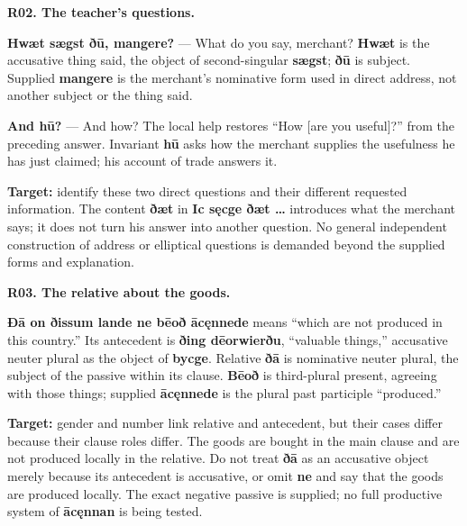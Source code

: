 \par\begin{minipage}{\linewidth}\raggedright
\textbf{R02. The teacher's questions.}

\textbf{Hwæt sægst ðū, mangere?} — What do you say, merchant? \textbf{Hwæt} is the accusative thing said, the object of second-singular \textbf{sægst}; \textbf{ðū} is subject. Supplied \textbf{mangere} is the merchant's nominative form used in direct address, not another subject or the thing said.

\textbf{And hū?} — And how? The local help restores “How [are you useful]?” from the preceding answer. Invariant \textbf{hū} asks how the merchant supplies the usefulness he has just claimed; his account of trade answers it.

\textbf{Target:} identify these two direct questions and their different requested information. The content \textbf{ðæt} in \textbf{Ic sęcge ðæt …} introduces what the merchant says; it does not turn his answer into another question. No general independent construction of address or elliptical questions is demanded beyond the supplied forms and explanation.

\end{minipage}\par\addvspace{4pt}

\par\begin{minipage}{\linewidth}\raggedright
\textbf{R03. The relative about the goods.}

\textbf{Ðā on ðissum lande ne bēoð ācęnnede} means “which are not produced in this country.” Its antecedent is \textbf{ðing dēorwierðu}, “valuable things,” accusative neuter plural as the object of \textbf{bycge}. Relative \textbf{ðā} is nominative neuter plural, the subject of the passive within its clause. \textbf{Bēoð} is third-plural present, agreeing with those things; supplied \textbf{ācęnnede} is the plural past participle “produced.”

\textbf{Target:} gender and number link relative and antecedent, but their cases differ because their clause roles differ. The goods are bought in the main clause and are not produced locally in the relative. Do not treat \textbf{ðā} as an accusative object merely because its antecedent is accusative, or omit \textbf{ne} and say that the goods are produced locally. The exact negative passive is supplied; no full productive system of \textbf{ācęnnan} is being tested.

\end{minipage}\par\addvspace{4pt}


